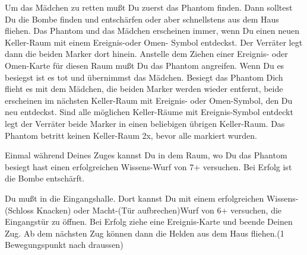 





Um das Mädchen zu retten mußt Du zuerst das Phantom finden. Dann solltest Du die Bombe finden und entschärfen oder aber schnellstens aus dem Haus fliehen.
Das Phantom und das Mädchen erscheinen immer, wenn Du einen neuen Keller-Raum mit einem Ereignis-oder Omen- Symbol entdeckst. Der Verräter legt dann die beiden Marker dort hinein.
Anstelle dem Ziehen einer Ereignis- oder Omen-Karte für diesen Raum mußt Du das Phantom angreifen. Wenn Du es besiegst ist es tot und übernimmst das Mädchen. Besiegt das Phantom Dich flieht es mit dem Mädchen, die beiden Marker werden wieder entfernt, beide erscheinen im nächsten Keller-Raum mit Ereignis- oder Omen-Symbol, den Du neu entdeckst.
Sind alle möglichen Keller-Räume mit Ereignis-Symbol entdeckt legt der Verräter beide Marker in einen beliebigen übrigen Keller-Raum. Das Phantom betritt keinen Keller-Raum 2x, bevor alle markiert wurden.


Einmal während Deines Zuges kannst Du in dem Raum, wo Du das Phantom besiegt hast einen erfolgreichen Wissens-Wurf von 7+ versuchen. Bei Erfolg ist die Bombe entschärft.



Du mußt in die Eingangshalle. Dort kannst Du mit einem erfolgreichen Wissens-(Schloss Knacken) oder Macht-(Tür aufbrechen)Wurf von 6+ versuchen, die Eingangstür zu öffnen.
Bei Erfolg ziehe eine Ereignis-Karte und beende Deinen Zug.
Ab dem nächsten Zug können dann die Helden aus dem Haus fliehen.(1 Bewegungspunkt nach draussen)



